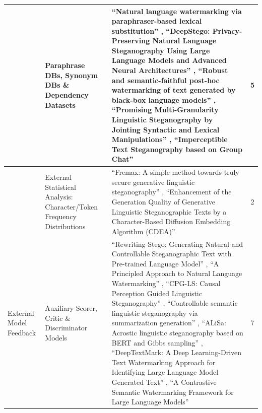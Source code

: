 \begin{table}[t]
\begin{tabular}{|>{\raggedright\arraybackslash}p{2cm}|>{\raggedright\arraybackslash}p{2cm}|>{\raggedright\arraybackslash}p{7cm}|c|}
    \hline
    \multirow{2}{2cm}{Linguistic Resource Integration}  & Paraphrase DBs, Synonym DBs \& Dependency Datasets                                & ``Natural language watermarking via paraphraser-based lexical substitution'' \cite{qiang2023natural}, ``DeepStego: Privacy-Preserving Natural Language Steganography Using Large Language Models and Advanced Neural Architectures'' \cite{kuznetsov2025deepstego}, ``Robust and semantic-faithful post-hoc watermarking of text generated by black-box language models'' \cite{hao2025robust}, ``Promising Multi-Granularity Linguistic Steganography by Jointing Syntactic and Lexical Manipulations'' \cite{ou2025multigranularity}, ``Imperceptible Text Steganography based on Group Chat'' \cite{li2024imperceptible}                                                                                                                                                               & 5              \\
    \cline{2-4}
                                                        & External Statistical Analysis: Character/Token Frequency Distributions            & ``Fremax: A simple method towards truly secure generative linguistic steganography'' \cite{pang2024fremax}, ``Enhancement of the Generation Quality of Generative Linguistic Steganographic Texts by a Character-Based Diffusion Embedding Algorithm (CDEA)'' \cite{chen2025cdea}                                                                                                                                                                                                                                                                                                                                                                                                                                                                                                         & 2              \\
    \hline
    External Model Feedback                             & Auxiliary Scorer, Critic \& Discriminator Models                                  & ``Rewriting-Stego: Generating Natural and Controllable Steganographic Text with Pre-trained Language Model'' \cite{li2023rewriting}, ``A Principled Approach to Natural Language Watermarking'' \cite{ji2024principled}, ``CPG-LS: Causal Perception Guided Linguistic Steganography'' \cite{xiang2023cpg}, ``Controllable semantic linguistic steganography via summarization generation'' \cite{zhang2024controllable}, ``ALiSa: Acrostic linguistic steganography based on BERT and Gibbs sampling'' \cite{yi2022alisa}, ``DeepTextMark: A Deep Learning-Driven Text Watermarking Approach for Identifying Large Language Model Generated Text'' \cite{munyer2024deeptextmark}, ``A Contrastive Semantic Watermarking Framework for Large Language Models'' \cite{wang2025contrastive} & 7              \\

\end{tabular}
\end{table}
